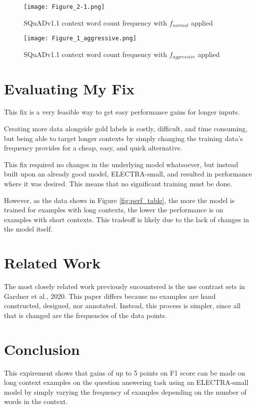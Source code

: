 \documentclass[twocolumn]{article}
\begin{document}
\begin{figure}
  \texttt{[image: Figure\_2-1.png]}
  \caption{SQuADv1.1 context word count frequency with $f_{normal}$ applied}
  \label{fig:normal_freq}
\end{figure}

\begin{figure}
  \texttt{[image: Figure\_1\_aggressive.png]}
  \caption{SQuADv1.1 context word count frequency with $f_{aggressive}$ applied}
  \label{fig:aggressive_freq}
\end{figure}

\section{Evaluating My Fix}

This fix is a very feasible way to get easy performance gains for longer inputs.

Creating more data alongside gold labels is costly, difficult, and time consuming, but being
able to target longer contexts by simply changing the training data's frequency provides
for a cheap, easy, and quick alternative. 

This fix required no changes in the underlying model whatsoever, but instead built upon an
already good model, ELECTRA-small, and resulted in performance where it was desired. This means
that no significant training must be done.

However, as the data shows in Figure \ref{fig:perf_table}, the more the model is trained for
examples with long contexts, the lower the performance is on examples with short contexts.
This tradeoff is likely due to the lack of changes in the model itself.

\section{Related Work}
The most closely related work previously encountered is the use contrast sets in Gardner et al., 2020.
This paper differs because no examples are hand constructed, designed, nor annotated. Instead, this
process is simpler, since all that is changed are the frequencies of the data points.

\section{Conclusion}
This expirement shows that gains of up to 5 points on F1 score can be made on long context examples
on the question answering task using an ELECTRA-small model by simply varying the frequency of
examples depending on the number of words in the context.

\printbibliography
\end{document}

